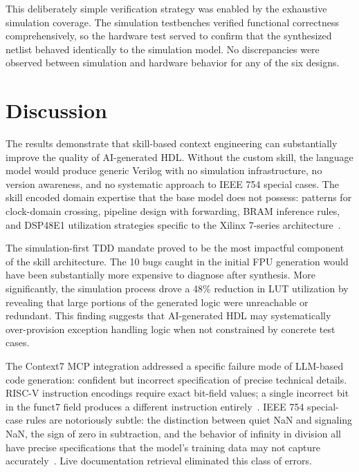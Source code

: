 \documentclass[conference]{IEEEtran}
\begin{document}
This deliberately simple verification strategy was enabled by the exhaustive simulation coverage. The simulation testbenches verified functional correctness comprehensively, so the hardware test served to confirm that the synthesized netlist behaved identically to the simulation model. No discrepancies were observed between simulation and hardware behavior for any of the six designs.

\section{Discussion}

The results demonstrate that skill-based context engineering can substantially improve the quality of AI-generated HDL. Without the custom skill, the language model would produce generic Verilog with no simulation infrastructure, no version awareness, and no systematic approach to IEEE 754 special cases. The skill encoded domain expertise that the base model does not possess: patterns for clock-domain crossing, pipeline design with forwarding, BRAM inference rules, and DSP48E1 utilization strategies specific to the Xilinx 7-series architecture~\cite{xilinx2020ds180}.

The simulation-first TDD mandate proved to be the most impactful component of the skill architecture. The 10 bugs caught in the initial FPU generation would have been substantially more expensive to diagnose after synthesis. More significantly, the simulation process drove a 48\% reduction in LUT utilization by revealing that large portions of the generated logic were unreachable or redundant. This finding suggests that AI-generated HDL may systematically over-provision exception handling logic when not constrained by concrete test cases.

The Context7 MCP integration addressed a specific failure mode of LLM-based code generation: confident but incorrect specification of precise technical details. RISC-V instruction encodings require exact bit-field values; a single incorrect bit in the funct7 field produces a different instruction entirely~\cite{waterman2019riscv}. IEEE 754 special-case rules are notoriously subtle: the distinction between quiet NaN and signaling NaN, the sign of zero in subtraction, and the behavior of infinity in division all have precise specifications that the model's training data may not capture accurately~\cite{ieee754_2019}. Live documentation retrieval eliminated this class of errors.
\end{document}
